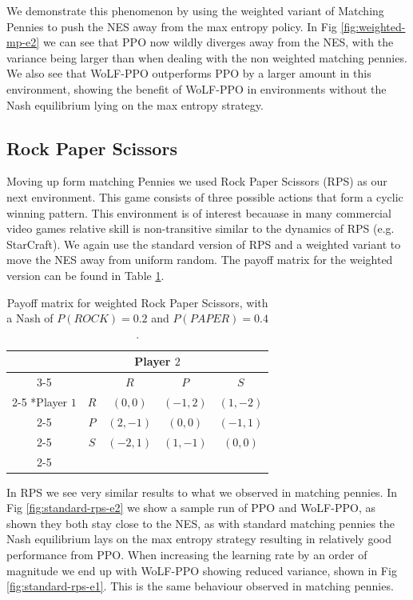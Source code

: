 \documentclass[conference]{IEEEtran}
\begin{document}
We demonstrate this phenomenon by using the weighted variant of Matching Pennies to push the NES away from the max entropy policy. In Fig \ref{fig:weighted-mp-e2} we can see that PPO now wildly diverges away from the NES, with the variance being larger than when dealing with the non weighted matching pennies. We also see that WoLF-PPO outperforms PPO by a larger amount in this environment, showing the benefit of WoLF-PPO in environments without the Nash equilibrium lying on the max entropy strategy.

\subsection{Rock Paper Scissors}

Moving up form matching Pennies we used Rock Paper Scissors (RPS) as our next environment. This game consists of three possible actions that form a cyclic winning pattern. This environment is of interest becauase in many commercial video games relative skill is non-transitive similar to the dynamics of RPS (e.g. StarCraft\cite{balduzzi2019open}). We again use the standard version of RPS and a weighted variant to move the NES away from uniform random. The payoff matrix for the weighted version can be found in Table \ref{tab:weighted-rps}.

\begin{table}[!ht]
    \centering
    \setlength{\extrarowheight}{2pt}
    \begin{tabular}{*{5}{c|}}
      \multicolumn{2}{c}{} & \multicolumn{2}{c}{Player $2$}\\\cline{3-5}
      \multicolumn{1}{c}{} &  & $R$  & $P$ & $S$ \\\cline{2-5}
      \multirow{2}*{Player $1$}  & $R$ & $(0,0)$ & $(-1,2)$ & $(1,-2)$ \\\cline{2-5}
      & $P$ & $(2,-1)$ & $(0,0)$ & $(-1,1)$ \\\cline{2-5}
      & $S$ & $(-2,1)$ & $(1,-1)$ & $(0,0)$ \\\cline{2-5}
    \end{tabular}
    \caption{Payoff matrix for weighted Rock Paper Scissors, with a Nash of $P(ROCK)=0.2$ and $P(PAPER)=0.4$.}
    \label{tab:weighted-rps}
\end{table}


In RPS we see very similar results to what we observed in matching pennies. In Fig \ref{fig:standard-rps-e2} we show a sample run of PPO and WoLF-PPO, as shown they both stay close to the NES, as with standard matching pennies the Nash equilibrium lays on the max entropy strategy resulting in relatively good performance from PPO. When increasing the learning rate by an order of magnitude we end up with WoLF-PPO showing reduced variance, shown in Fig \ref{fig:standard-rps-e1}. This is the same behaviour observed in matching pennies.
\end{document}
